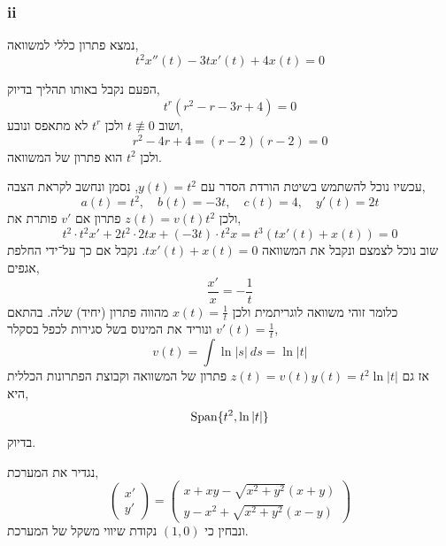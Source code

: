 \subsubsection{ii}
נמצא פתרון כללי למשוואה,
\[
	t^2 x''(t) - 3t x'(t) + 4 x(t) = 0
\]
\begin{solution}
	הפעם נקבל באותו תהליך בדיוק,
	\[
		t^r (r^2 - r  - 3r + 4) = 0
	\]
	ושוב $t \not\equiv 0$ ולכן $t^r$ לא מתאפס ונובע,
	\[
		r^2 - 4r + 4
		= (r - 2)(r - 2)
		= 0
	\]
	ולכן $t^2$ הוא פתרון של המשוואה.

	עכשיו נוכל להשתמש בשיטת הורדת הסדר עם $y(t) = t^2$,
	נסמן ונחשב לקראת הצבה,
	\[
		a(t) = t^2,
		\quad
		b(t) = -3t,
		\quad
		c(t) = 4,
		\quad
		y'(t) = 2t
	\]
	ולכן $z(t) = v(t) t^2$ פתרון אם $v'$ פותרת את,
	\[
		t^2 \cdot t^2 x' + 2 t^2 \cdot 2t x + (-3t) \cdot t^2 x
		= t^3 (t x'(t) + x(t))
		= 0
	\]
	שוב נוכל לצמצם ונקבל את המשוואה $t x'(t) + x(t) = 0$.
	נקבל אם כך על־ידי החלפת אגפים,
	\[
		\frac{x'}{x} = -\frac{1}{t}
	\]
	כלומר זוהי משוואה לוגריתמית ולכן $x(t) = \frac{1}{t}$ מהווה פתרון (יחיד) שלה.
	בהתאם $v'(t) = \frac{1}{t}$ ונוריד את המינוס בשל סגירות לכפל בסקלר,
	\[
		v(t)
		= \int \ln |s|\ ds
		= \ln |t|
	\]
	אז גם $z(t) = v(t) y(t) = t^2 \ln |t|$ פתרון של המשוואה וקבוצת הפתרונות הכללית היא,
	\[
		\operatorname{Span}\{ t^2, \ln |t| \}
	\]
	בדיוק.
\end{solution}

\question{}
נגדיר את המערכת,
\[
	\begin{pmatrix}
		x' \\
		y'
	\end{pmatrix}
	= \begin{pmatrix}
		x + xy - \sqrt{x^2 + y^2} (x + y) \\
		y - x^2 + \sqrt{x^2 + y^2} (x - y)
	\end{pmatrix}
\]
ונבחין כי $(1, 0)$ נקודת שיווי משקל של המערכת.

